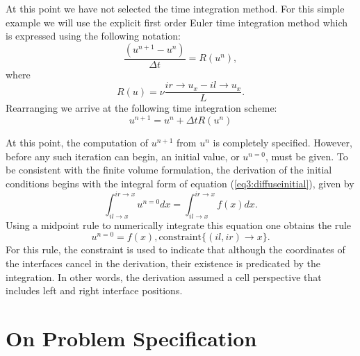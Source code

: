 \documentclass[10pt,epsf]{book}
\begin{document}
At this point we have not selected the time integration method.  For
this simple example we will use the explicit first order Euler time
integration method which is expressed using the following notation:
\begin{equation}
\frac{(u^{n+1}-u^{n})}{\Delta t} = R(u^n),
\end{equation}
where
\begin{equation}
R(u) = \nu \frac{{ir \rightarrow u_x - il \rightarrow u_x} }{L}.
\label{eq3:residue}
\end{equation}
Rearranging we arrive at the following time integration scheme:
\begin{equation}
u^{n+1} = u^{n} + \Delta t R(u^n)
\label{eq3:eulerStep}
\end{equation}


At this point, the computation of $u^{n+1}$ from $u^n$ is completely
specified.  However, before any such iteration can begin, an initial
value, or $u^{n=0}$, must be given.  To be consistent with the finite
volume formulation, the derivation of the initial conditions begins
with the integral form of equation (\ref{eq3:diffuseinitial}), given by
\begin{equation}
\int^{ir\rightarrow x}_{il\rightarrow x} u^{n=0} dx =
\int^{ir\rightarrow x}_{il\rightarrow x} f(x) dx.
\end{equation}
Using a midpoint rule to numerically integrate this equation one
obtains the rule
\begin{equation}
u^{n=0} = f(x), \mbox{constraint}\lbrace (il,ir)\rightarrow x\rbrace.
\label{eq3:ic}
\end{equation}
For this rule, the constraint is used to indicate that although the
coordinates of the interfaces cancel in the derivation, their
existence is predicated by the integration.  In other words, the
derivation assumed a cell perspective that includes left and right
interface positions.

\section{On Problem Specification}
\end{document}
